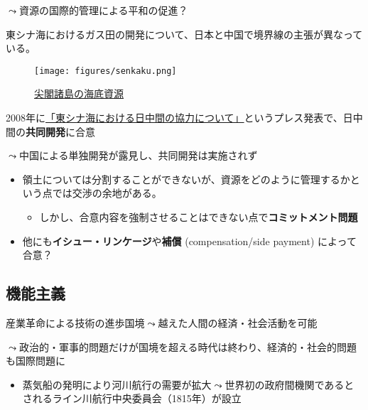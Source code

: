 \documentclass[
  xelatex,
  ja=standard]{bxjsarticle}
\providecommand{\tightlist}{%
  \setlength{\itemsep}{0pt}\setlength{\parskip}{0pt}}\usepackage{longtable,booktabs,array}
\begin{document}
\(\leadsto\)資源の国際的管理による平和の促進？

東シナ海におけるガス田の開発について、日本と中国で境界線の主張が異なっている。

\begin{figure}[htpb]

{\centering \texttt{[image: figures/senkaku.png]}

}

\caption{\href{https://commons.wikimedia.org/wiki/File:East_China_sea_digging_map.svg}{尖閣諸島の海底資源}}

\end{figure}

2008年に\href{https://www.mofa.go.jp/mofaj/area/china/higashi_shina/press.html}{「東シナ海における日中間の協力について」}というプレス発表で、日中間の\textbf{共同開発}に合意

\(\leadsto\)中国による単独開発が露見し、共同開発は実施されず

\begin{itemize}
\tightlist
\item
  領土については分割することができないが、資源をどのように管理するかという点では交渉の余地がある。

  \begin{itemize}
  \tightlist
  \item
    しかし、合意内容を強制させることはできない点で\textbf{コミットメント問題}
  \end{itemize}
\item
  他にも\textbf{イシュー・リンケージ}や\textbf{補償} (compensation/side
  payment) によって合意？
\end{itemize}

\hypertarget{ux6a5fux80fdux4e3bux7fa9}{%
\subsection{機能主義}\label{ux6a5fux80fdux4e3bux7fa9}}

産業革命による技術の進歩国境\(\leadsto\)越えた人間の経済・社会活動を可能

\(\leadsto\)政治的・軍事的問題だけが国境を超える時代は終わり、経済的・社会的問題も国際問題に

\begin{itemize}
\tightlist
\item
  蒸気船の発明により河川航行の需要が拡大\(\leadsto\)世界初の政府間機関であるとされるライン川航行中央委員会（1815年）が設立
\end{itemize}
\end{document}
